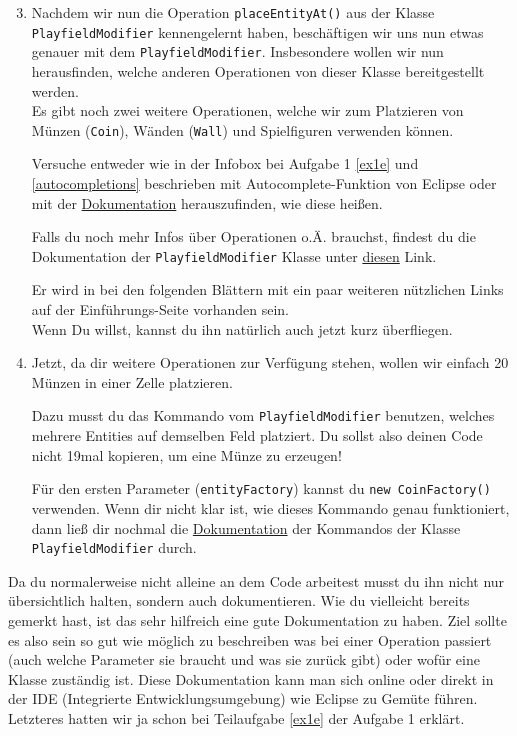 \begin{enumerate}
	\setcounter{enumi}{2}
    \item Nachdem wir nun die Operation \lstinline{placeEntityAt()} aus der Klasse \lstinline{PlayfieldModifier} kennengelernt haben, beschäftigen wir uns nun etwas genauer mit dem \lstinline{PlayfieldModifier}.
    Insbesondere wollen wir nun herausfinden, welche anderen Operationen von dieser Klasse bereitgestellt werden.\\
    Es gibt noch zwei weitere Operationen, welche wir zum Platzieren von Münzen (\lstinline{Coin}), Wänden (\lstinline{Wall}) und Spielfiguren verwenden können.

    Versuche entweder wie in der Infobox bei Aufgabe 1 \ref{ex1e} und \ref{autocompletions} beschrieben mit Autocomplete-Funktion von Eclipse oder mit der \href{\javadocRoot}{Dokumentation} herauszufinden, wie diese heißen.

    Falls du noch mehr Infos über Operationen o.Ä. brauchst, findest du die Dokumentation der \newline \lstinline{PlayfieldModifier} Klasse unter \href{\javadocRoot\PlayFieldModifierDocLinkSuffix}{diesen} Link.

    Er wird in bei den folgenden Blättern mit ein paar weiteren nützlichen Links auf der Einführungs-Seite vorhanden sein.\\
	Wenn Du willst, kannst du ihn natürlich auch jetzt kurz überfliegen.

    \item Jetzt, da dir weitere Operationen zur Verfügung stehen, wollen wir einfach 20 Münzen in einer Zelle platzieren.

    Dazu musst du das Kommando vom \lstinline{PlayfieldModifier} benutzen, welches mehrere Entities auf demselben Feld platziert. Du sollst also deinen Code nicht 19mal kopieren, um eine Münze zu erzeugen!

    Für den ersten Parameter (\lstinline{entityFactory}) kannst du \lstinline{new CoinFactory()} verwenden.
    Wenn dir nicht klar ist, wie dieses Kommando genau funktioniert, dann ließ dir nochmal die \href{\javadocRoot\PlayFieldModifierDocLinkSuffix}{Dokumentation} der Kommandos der Klasse \lstinline{PlayfieldModifier} durch.
\end{enumerate}

\begin{Infobox}
    Da du normalerweise nicht alleine an dem Code arbeitest musst du ihn nicht nur übersichtlich halten, sondern auch dokumentieren.\newline
    Wie du vielleicht bereits gemerkt hast, ist das sehr hilfreich eine gute Dokumentation zu haben.
    Ziel sollte es also sein so gut wie möglich zu beschreiben was bei einer Operation passiert (auch welche Parameter sie braucht und was sie zurück gibt) oder wofür eine Klasse zuständig ist.\newline
    Diese Dokumentation kann man sich online oder direkt in der IDE (Integrierte Entwicklungsumgebung) wie Eclipse zu Gemüte führen. Letzteres hatten wir ja schon bei Teilaufgabe \ref{ex1e} der Aufgabe 1 erklärt.
\end{Infobox}


